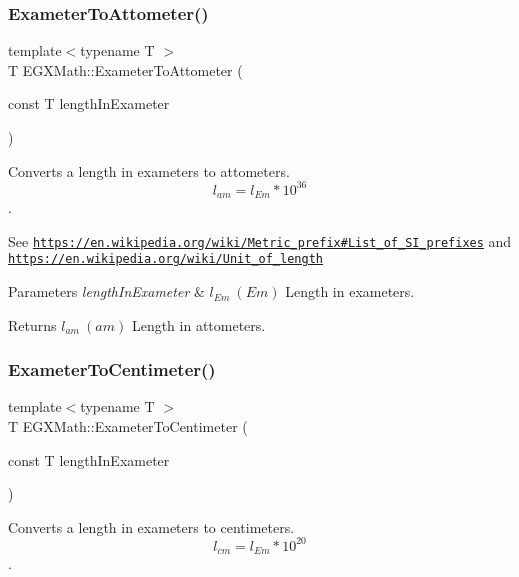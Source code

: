 \subsubsection{\texorpdfstring{Exameter\+To\+Attometer()}{ExameterToAttometer()}}
{\footnotesize\ttfamily template$<$typename T $>$ \\
T E\+G\+X\+Math\+::\+Exameter\+To\+Attometer (\begin{DoxyParamCaption}\item[{const T}]{length\+In\+Exameter }\end{DoxyParamCaption})}



Converts a length in exameters to attometers. \[ l_{am}=l_{Em} * 10^{36} \]. 

See \href{https://en.wikipedia.org/wiki/Metric_prefix#List_of_SI_prefixes}{\tt https\+://en.\+wikipedia.\+org/wiki/\+Metric\+\_\+prefix\#\+List\+\_\+of\+\_\+\+S\+I\+\_\+prefixes} and \href{https://en.wikipedia.org/wiki/Unit_of_length}{\tt https\+://en.\+wikipedia.\+org/wiki/\+Unit\+\_\+of\+\_\+length} 
\begin{DoxyParams}{Parameters}
{\em length\+In\+Exameter} & $ l_{Em}\ (Em)$ Length in exameters. \\
\hline
\end{DoxyParams}
\begin{DoxyReturn}{Returns}
$ l_{am}\ (am)$ Length in attometers. 
\end{DoxyReturn}
\mbox{\label{group___e_g_x_math-_conversions-_length_conversions-_s_i-_exameter-_s_i_ga6f379e6cd3c3523fb3ff16eadcbefba9}} 
\subsubsection{\texorpdfstring{Exameter\+To\+Centimeter()}{ExameterToCentimeter()}}
{\footnotesize\ttfamily template$<$typename T $>$ \\
T E\+G\+X\+Math\+::\+Exameter\+To\+Centimeter (\begin{DoxyParamCaption}\item[{const T}]{length\+In\+Exameter }\end{DoxyParamCaption})}



Converts a length in exameters to centimeters. \[ l_{cm}=l_{Em} * 10^{20} \]. 


